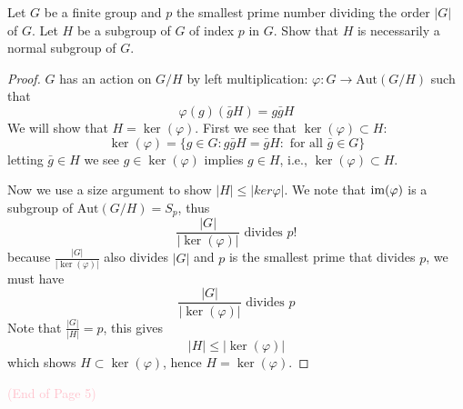 \begin{prob}[S2001-Q1]
    Let \( G \) be a finite group and \( p \) the smallest prime number dividing the order \( |G| \) of \( G \). Let \( H \) be a subgroup of \( G \) of index \( p \) in \( G \). Show that \( H \) is necessarily a normal subgroup of \( G \).
\end{prob}
\begin{proof}
    $G$ has an action on $G/H$ by left multiplication: $\varphi: G\to\text{Aut}(G/H)$ such that 
    \begin{equation*}
        \varphi(g)(\bar{g}H)=g\bar{g}H
    \end{equation*}
    We will show that $H=\ker(\varphi)$. First we see that $\ker(\varphi)\subset H$: 
    \begin{equation*}
        \ker(\varphi)=\{g\in G: g\bar{g}H=\bar{g}H: \text{ for all }\bar{g}\in G\}
    \end{equation*}
    letting $\bar{g}\in H$ we see $g\in\ker(\varphi)$ implies $g\in H$, i.e., $\ker(\varphi)\subset H$. 

    Now we use a size argument to show $|H|\leq|ker\varphi|$. We note that $\operatorname{im}(\varphi)$ is a subgroup of $\text{Aut}(G/H)=S_p$, thus 
    \begin{equation*}
        \frac{|G|}{|\ker(\varphi)|}\text{ divides } p!
    \end{equation*}
    because $\frac{|G|}{|\ker(\varphi)|}$ also divides $|G|$ and $p$ is the smallest prime that divides $p$, we must have 
    \begin{equation*}
        \frac{|G|}{|\ker(\varphi)|} \text{ divides } p
    \end{equation*}
    Note that $\frac{|G|}{|H|}=p$, this gives 
    \begin{equation*}
        |H|\leq|\ker(\varphi)|
    \end{equation*}
    which shows $H\subset\ker(\varphi)$, hence $H=\ker(\varphi)$.
\end{proof}




\begin{center}\textcolor{pink}{(End of Page 5)}
\end{center}

